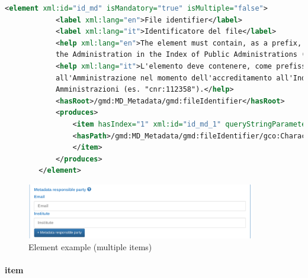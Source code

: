 \documentclass[10pt]{article}
\begin{document}
	\begin{lstlisting}[language=XML]
		<element xml:id="id_md" isMandatory="true" isMultiple="false">
			<label xml:lang="en">File identifier</label>
			<label xml:lang="it">Identificatore del file</label>
			<help xml:lang="en">The element must contain, as a prefix, the iPA code assigned by 
			the Administration in the Index of Public Administrations (e.g., "cnr:112358").</help>
			<help xml:lang="it">L'elemento deve contenere, come prefisso, il codice iPA assegnato
			all'Amministrazione nel momento dell'accreditamento all'Indice delle Pubbliche
			Amministrazioni (es. "cnr:112358").</help>
			<hasRoot>/gmd:MD_Metadata/gmd:fileIdentifier</hasRoot>
			<produces>
				<item hasIndex="1" xml:id="id_md_1" queryStringParameter="uid" isFixed="true" hasDatatype="string">
				<hasPath>/gmd:MD_Metadata/gmd:fileIdentifier/gco:CharacterString</hasPath>
				</item>
			</produces>
		</element>
	\end{lstlisting}
	
	\begin{figure}[h]
		\caption{Element example (multiple items)}
		\includegraphics[width=10cm]{Element multiple items.png}
		\centering
	\end{figure}
	
	
	\paragraph{item} \label{item}
	
\end{document}
